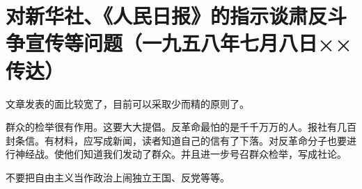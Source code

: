 \section[对新华社、《人民日报》的指示谈肃反斗争宣传等问题（一九五八年七月八日××传达）]{对新华社、《人民日报》的指示谈肃反斗争宣传等问题（一九五八年七月八日××传达）}


文章发表的面比较宽了，目前可以采取少而精的原则了。

群众的检举很有作用。这要大大提倡。反革命最怕的是千千万万的人。报社有几百封条信。有材料，应写成新闻，读者知道自己的信有了下落。对反革命分子也要进行神经战。使他们知道我们发动了群众。并且进一步号召群众检举，写成社论。

不要把自由主义当作政治上闹独立王国、反党等等。


